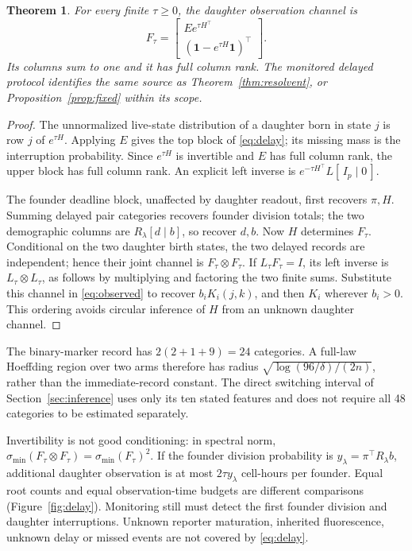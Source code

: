 \documentclass[11pt]{article}
\newtheorem{theorem}{Theorem}[section]
\theoremstyle{definition}
\newcommand{\one}{\mathbf 1}
\begin{document}
\begin{theorem}\label{thm:delay}
For every finite $\tau\ge0$, the daughter observation channel is
\begin{equation}\label{eq:delay}
 F_\tau=\begin{bmatrix}E e^{\tau H^\top}\\
                  (\one-e^{\tau H}\one)^\top\end{bmatrix}.
\end{equation}
Its columns sum to one and it has full column rank. The monitored delayed
protocol identifies the same source as Theorem~\ref{thm:resolvent}, or
Proposition~\ref{prop:fixed} within its scope.
\end{theorem}
\begin{proof}
The unnormalized live-state distribution of a daughter born in state $j$ is row
$j$ of $e^{\tau H}$. Applying $E$ gives the top block of \eqref{eq:delay}; its
missing mass is the interruption probability. Since $e^{\tau H}$ is invertible
and $E$ has full column rank, the upper block has full column rank. An explicit
left inverse is $e^{-\tau H^\top}L[\,I_p\mid0\,]$.

The founder deadline block, unaffected by daughter readout, first recovers
$\pi,H$. Summing delayed pair categories recovers founder division totals; the
two demographic columns are $R_\lambda[d\mid b]$, so recover $d,b$. Now $H$
determines $F_\tau$. Conditional on the two daughter birth states, the two
delayed records are independent; hence their joint channel is
$F_\tau\otimes F_\tau$. If $L_\tau F_\tau=I$, its left inverse is
$L_\tau\otimes L_\tau$, as follows by multiplying and factoring the two finite
sums. Substitute this channel in \eqref{eq:observed} to recover $b_iK_i(j,k)$,
and then $K_i$ wherever $b_i>0$. This ordering avoids circular inference of $H$
from an unknown daughter channel.
\end{proof}
The binary-marker record has $2(2+1+9)=24$ categories. A full-law Hoeffding
region over two arms therefore has radius $\sqrt{\log(96/\delta)/(2n)}$, rather
than the immediate-record constant. The direct switching interval of
Section~\ref{sec:inference} uses only its ten stated features and does not
require all 48 categories to be estimated separately.

Invertibility is not good conditioning: in spectral norm,
$\sigma_{\min}(F_\tau\otimes F_\tau)=\sigma_{\min}(F_\tau)^2$. If the founder
division probability is $y_\lambda=\pi^\top R_\lambda b$, additional daughter
observation is at most $2\tau y_\lambda$ cell-hours per founder. Equal root
counts and equal observation-time budgets are different comparisons
(Figure~\ref{fig:delay}). Monitoring still must detect the first founder
division and daughter interruptions. Unknown reporter maturation, inherited
fluorescence, unknown delay or missed events are not covered by
\eqref{eq:delay}.
\end{document}

